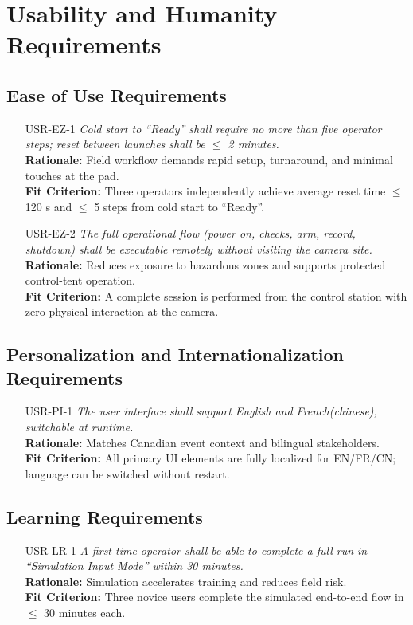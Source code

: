 \documentclass[12pt]{article}
\begin{document}
\section{Usability and Humanity Requirements}
\subsection{Ease of Use Requirements}
\begin{itemize}[leftmargin=*]
  \item[USR-EZ-1] \emph{Cold start to “Ready” shall require no more than five operator steps; reset between launches shall be $\leq$ 2 minutes.}\\
  \textbf{Rationale:} Field workflow demands rapid setup, turnaround, and minimal touches at the pad.\\
  \textbf{Fit Criterion:} Three operators independently achieve average reset time $\leq$ 120 s and $\leq$ 5 steps from cold start to “Ready”.

  \item[USR-EZ-2] \emph{The full operational flow (power on, checks, arm, record, shutdown) shall be executable remotely without visiting the camera site.}\\
  \textbf{Rationale:} Reduces exposure to hazardous zones and supports protected control-tent operation.\\
  \textbf{Fit Criterion:} A complete session is performed from the control station with zero physical interaction at the camera.
\end{itemize}


\subsection{Personalization and Internationalization Requirements}
\begin{itemize}[leftmargin=*]
  \item[USR-PI-1] \emph{The user interface shall support English and French(chinese), switchable at runtime.}\\
  \textbf{Rationale:} Matches Canadian event context and bilingual stakeholders.\\
  \textbf{Fit Criterion:} All primary UI elements are fully localized for EN/FR/CN; language can be switched without restart.
\end{itemize}

\subsection{Learning Requirements}
\begin{itemize}[leftmargin=*]
  \item[USR-LR-1] \emph{A first-time operator shall be able to complete a full run in “Simulation Input Mode” within 30 minutes.}\\
  \textbf{Rationale:} Simulation accelerates training and reduces field risk.\\
  \textbf{Fit Criterion:} Three novice users complete the simulated end-to-end flow in $\leq$ 30 minutes each.
\end{itemize}
\end{document}

